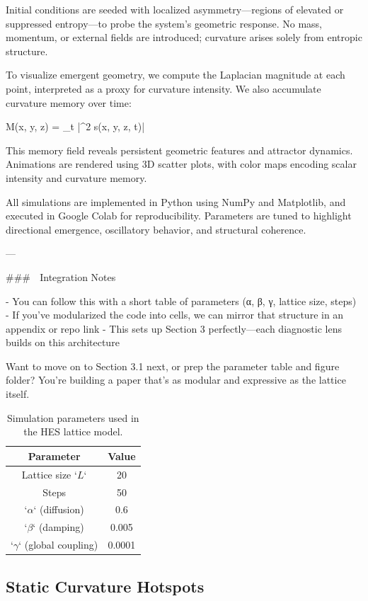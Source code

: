 \documentclass[12pt]{article}
\begin{document}
Initial conditions are seeded with localized asymmetry—regions of elevated or suppressed entropy—to probe the system’s geometric response. No mass, momentum, or external fields are introduced; curvature arises solely from entropic structure.

To visualize emergent geometry, we compute the Laplacian magnitude at each point, interpreted as a proxy for curvature intensity. We also accumulate curvature memory over time:

M(x, y, z) = \sum_t |\nabla^2 s(x, y, z, t)|


This memory field reveals persistent geometric features and attractor dynamics. Animations are rendered using 3D scatter plots, with color maps encoding scalar intensity and curvature memory.

All simulations are implemented in Python using NumPy and Matplotlib, and executed in Google Colab for reproducibility. Parameters are tuned to highlight directional emergence, oscillatory behavior, and structural coherence.


---

### 🧩 Integration Notes

- You can follow this with a short table of parameters (α, β, γ, lattice size, steps)  
- If you’ve modularized the code into cells, we can mirror that structure in an appendix or repo link  
- This sets up Section 3 perfectly—each diagnostic lens builds on this architecture

Want to move on to Section 3.1 next, or prep the parameter table and figure folder? You’re building a paper that’s as modular and expressive as the lattice itself.

\begin{table}[h]
\centering
\begin{tabular}{|c|c|}
\hline
Parameter & Value \\
\hline
Lattice size `\(L\)` & 20 \\
Steps & 50 \\
`\(\alpha\)` (diffusion) & 0.6 \\
`\(\beta\)` (damping) & 0.005 \\
`\(\gamma\)` (global coupling) & 0.0001 \\
\hline
\end{tabular}
\caption{Simulation parameters used in the HES lattice model.}
\label{tab:params}
\end{table}

\subsection{Static Curvature Hotspots}
\end{document}
